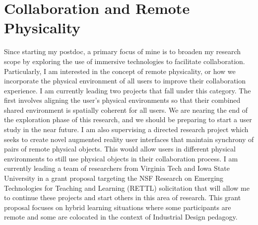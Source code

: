 \section*{Collaboration and Remote Physicality}
\vspace{-0.5cm}
Since starting my postdoc, a primary focus of mine is to broaden my research scope by exploring the use of immersive technologies to facilitate collaboration. Particularly, I am interested in the concept of remote physicality, or how we incorporate the physical environment of all users to improve their collaboration experience. I am currently leading two projects that fall under this category. The first involves aligning the user's physical environments so that their combined shared environment is spatially coherent for all users. We are nearing the end of the exploration phase of this research, and we should be preparing to start a user study in the near future. I am also supervising a directed research project which seeks to create novel augmented reality user interfaces that maintain synchrony of pairs of remote physical objects. This would allow users in different physical environments to still use physical objects in their collaboration process. I am currently leading a team of researchers from Virginia Tech and Iowa State University in a grant proposal targeting the NSF Research on Emerging Technologies for Teaching and Learning (RETTL) solicitation that will allow me to continue these projects and start others in this area of research. This grant proposal focuses on hybrid learning situations where some participants are remote and some are colocated in the context of Industrial Design pedagogy.




\label{research_last}
